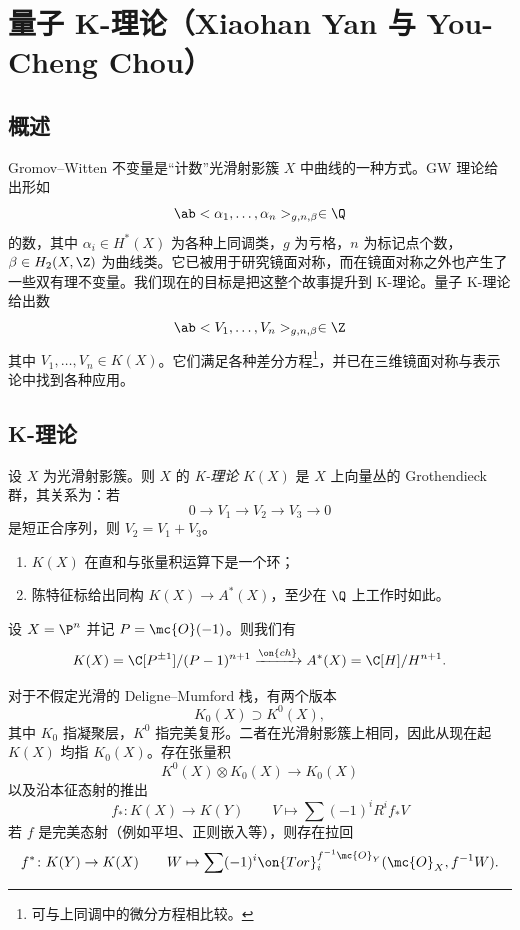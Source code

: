 \section{量子 K-理论（Xiaohan Yan 与 You-Cheng Chou）}%
\label{sec:Quantum K-theory (Xiaohan Yan and You-Cheng Chou)}

\subsection{概述}%
\label{sub:Overview}

Gromov–Witten 不变量是``计数''光滑射影簇 \(X\) 中曲线的一种方式。GW 理论给出形如
\[ \ab<\alpha_1, \ldots, \alpha_n>_{g, n, \beta} \in \Q \]
的数，其中 \(\alpha_i \in H^*(X)\) 为各种上同调类，\(g\) 为亏格，\(n\) 为标记点个数，\(\beta \in H_2(X, \Z)\) 为曲线类。它已被用于研究镜面对称，而在镜面对称之外也产生了一些双有理不变量。我们现在的目标是把这整个故事提升到 K-理论。量子 K-理论给出数
\[ \ab<V_1, \ldots, V_n>_{g, n, \beta} \in \Z \]
其中 \(V_1, \ldots, V_n \in K(X)\)。它们满足各种差分方程\footnote{可与上同调中的微分方程相比较。}，并已在三维镜面对称与表示论中找到各种应用。

\subsection{K-理论}%
\label{sub:K-theory}

\begin{defn}
    设 \(X\) 为光滑射影簇。则 \(X\) 的 \textit{K-理论} \(K(X)\) 是 \(X\) 上向量丛的 Grothendieck 群，其关系为：若
    \[ 0 \to V_1 \to V_2 \to V_3 \to 0 \]
    是短正合序列，则 \(V_2 = V_1 + V_3\)。
\end{defn}

\begin{rmk}\leavevmode
    \begin{enumerate}
        \item \(K(X)\) 在直和与张量积运算下是一个环；
        \item 陈特征标给出同构 \(K(X) \to A^*(X)\)，至少在 \(\Q\) 上工作时如此。
    \end{enumerate}
\end{rmk}

\begin{exm}
    设 \(X = \P^n\) 并记 \(P = \mc{O}(-1)\)。则我们有
    \[ K(X) = \C[P^{\pm 1}]/(P-1)^{n+1} \xrightarrow{\on{ch}} A^*(X) = \C[H]/H^{n+1}. \]
\end{exm}

对于不假定光滑的 Deligne–Mumford 栈，有两个版本
\[ K_0(X) \supset K^0(X), \]
其中 \(K_0\) 指凝聚层，\(K^0\) 指完美复形。二者在光滑射影簇上相同，因此从现在起 \(K(X)\) 均指 \(K_0(X)\)。存在张量积
\[ K^0(X) \otimes K_0(X) \to K_0(X) \]
以及沿本征态射的推出
\[ f_* \colon K(X) \to K(Y) \qquad V \mapsto \sum (-1)^i R^i f_* V \]
若 \(f\) 是完美态射（例如平坦、正则嵌入等），则存在拉回
\[ f^* \colon K(Y) \to K(X) \qquad W \mapsto \sum (-1)^i \on{Tor}_i^{f^{-1} \mc{O}_Y} (\mc{O}_X, f^{-1} W). \]

